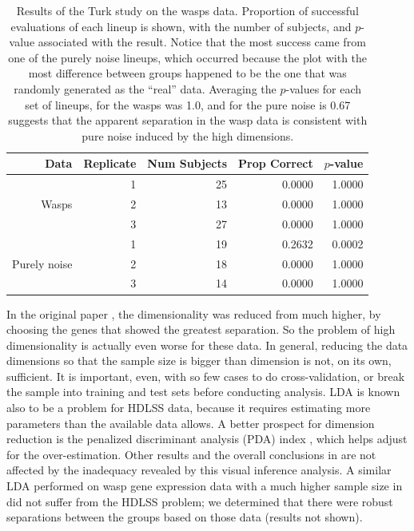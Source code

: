 \begin{table}[ht]
\begin{center}
\caption{Results of the Turk study on the wasps data. Proportion of successful evaluations of each lineup is shown, with the number of subjects, and $p$-value associated with the result. Notice that the most success came from one of the purely noise lineups, which occurred because the plot with the most difference between groups happened to be the one that was randomly generated as the ``real'' data. Averaging the $p$-values for each set of lineups, for the wasps was 1.0, and for the pure noise is 0.67 suggests that the apparent separation in the wasp data is consistent with pure noise induced by the high dimensions.}
\vspace{0.15cm}
\begin{tabular}{r|r|r|rr}
\hline
  \hline
 Data & Replicate & Num Subjects & Prop Correct & $p$-value\\ 
  \hline
  & 1 & 25 & 0.0000 &  1.0000\\
Wasps & 2 & 13 & 0.0000 &  1.0000\\ 
 & 3 & 27 & 0.0000 &  1.0000\\
 \hline
 & 1 & 19 & 0.2632 &  0.0002\\
Purely noise & 2 & 18 & 0.0000 &  1.0000 \\ 
 & 3 & 14 & 0.0000 &  1.0000\\
   \hline
\end{tabular}
\label{wasp}
\end{center}
\end{table}

In the original paper \citep{toth:2010}, the dimensionality was reduced from much higher, by choosing the genes that showed the greatest separation. So the problem of high dimensionality is actually even worse for these data. In general, reducing the data dimensions so that the sample size is bigger than dimension is not, on its own, sufficient. It is important, even, with so few cases to do cross-validation, or break the sample into training and test sets before conducting analysis. LDA is known also to be a problem for HDLSS data, because it requires estimating more parameters than the available data allows. A better prospect for dimension reduction is the penalized discriminant analysis (PDA) index \citep{lee:2009}, which helps adjust for the over-estimation. Other results and the overall conclusions in \cite{toth:2010} are not affected by the inadequacy revealed by this visual inference analysis. A similar LDA performed on wasp gene expression data with a much higher sample size in \citep{toth:2007} did not suffer from the HDLSS problem; we determined that there were robust separations between the groups based on those data (results not shown).

